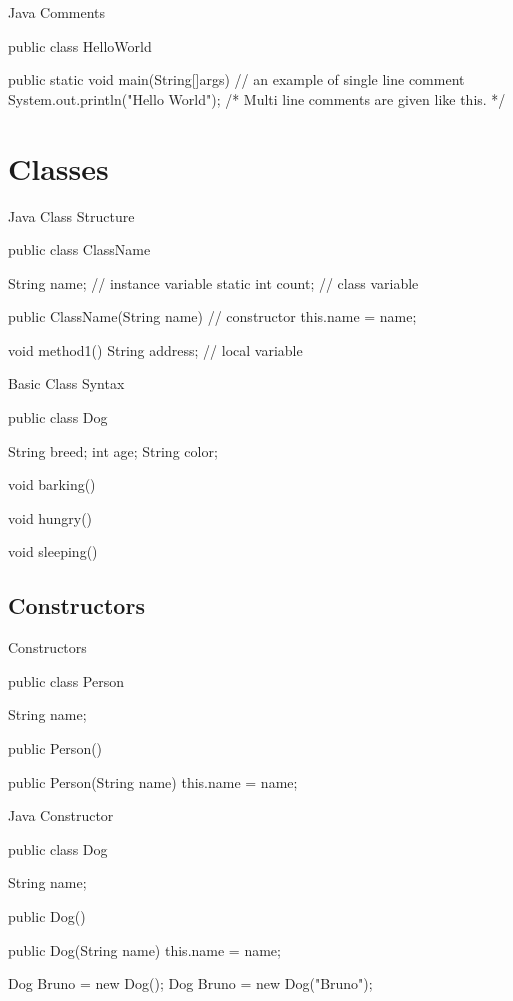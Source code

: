 \documentclass[11pt]{beamer}
\begin{document}
\begin{frame}[containsverbatim]{Java Comments}
\begin{java}
public class HelloWorld{

public static void main(String[]args){
  // an example of single line comment
  System.out.println("Hello World");
  /* Multi line comments 
   are given like this. */
  }
}
\end{java}
\end{frame}

\section{Classes}
\begin{frame}[containsverbatim]{Java Class Structure}
\begin{java}
public class ClassName{
  String name;      // instance variable
  static int count; // class variable

  public ClassName(String name){ // constructor
    this.name = name;  
  }

  void method1(){
    String address; // local variable
  }  
}
\end{java}

\end{frame}


\begin{frame}[containsverbatim]{Basic Class Syntax}
\begin{java}
public class Dog{
	String breed;
	int age;
	String color;

	void barking(){
	}

	void hungry(){
	}

	void sleeping(){
	}
}
\end{java}
\end{frame}

\subsection{Constructors}
\begin{frame}[containsverbatim]{Constructors}
\begin{java}
public class Person{

	String name;
	
	public Person(){
	}
	
	public Person(String name){
		this.name = name;
	}
}
\end{java}
\end{frame}

\begin{frame}[containsverbatim]{Java Constructor}
\begin{java}
public class Dog{
  String name;  
  
  public Dog(){
  }

  public Dog(String name){
  this.name = name;
  }
}
\end{java}


\begin{java}
Dog Bruno = new Dog();
Dog Bruno = new Dog("Bruno");
\end{java}

\end{frame}
\end{document}
